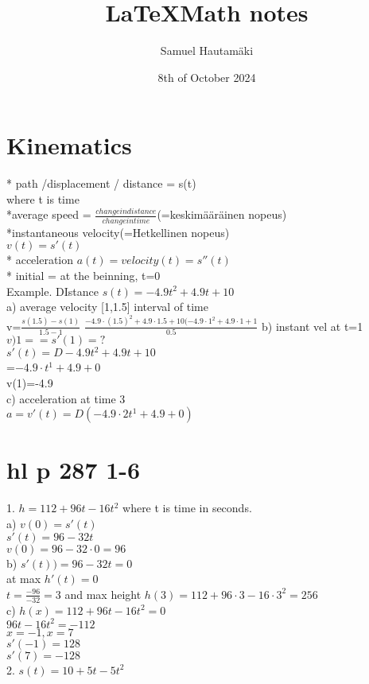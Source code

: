 \documentclass{article}
\title{\LaTeX Math notes}
\author{Samuel Hautamäki}
\date{8th of October 2024}
\begin{document}
  \maketitle
   
  \section{Kinematics}
  * path /displacement / distance = s(t)\\
  where t is time\\
  *average speed = $\frac{change in distance}{change in time}$(=keskimääräinen nopeus)\\
  *instantaneous velocity(=Hetkellinen nopeus)\\
  $v(t)=s'(t)$\\
  * acceleration $a(t)=velocity(t)=s''(t)$\\
  * initial = at the beinning, t=0\\

  Example. DIstance $s(t)=-4.9t^2+4.9t+10$\\
  a) average velocity [1,1.5] interval of time\\
  v=$\frac{s(1.5)-s(1)}{1.5-1}$
  $\frac{-4.9\cdot (1.5)^2 + 4.9\cdot 1.5+10(-4.9\cdot 1^2+4.9\cdot 1+1}{0.5}$
  b) instant vel at t=1 $v)1==s'(1)=?$\\
  $s'(t)=D-4.9t^2+4.9t+10$\\
  =$-4.9\cdot t^1+4.9+0$\\
  v(1)=-4.9\\
  c) acceleration at time 3\\
  $a=v'(t)= D(-4.9\cdot 2t^1+4.9+0)$\\
  \section{hl p 287 1-6}
  1. $h=112+96t-16t^2$ where t is time in seconds.\\
  a) $v(0)=s'(t)$\\
  $s'(t)=96-32t$\\
  $v(0)=96-32\cdot0=96$\\
  b) $s'(t))=96-32t=0$\\
  at max $h'(t)=0$\\
  $t=\frac{-96}{-32}=3$ and max height $h(3)=112+96\cdot3-16\cdot3^2=256$\\
  c) $h(x)=112+96t-16t^2=0$\\
  $96t-16t^2=-112$\\
  $x=-1, x=7$\\
  $s'(-1)=128$\\
  $s'(7)=-128$\\
  2. $s(t)=10+5t-5t^2$\\
  
  
  

   
\end{document}
